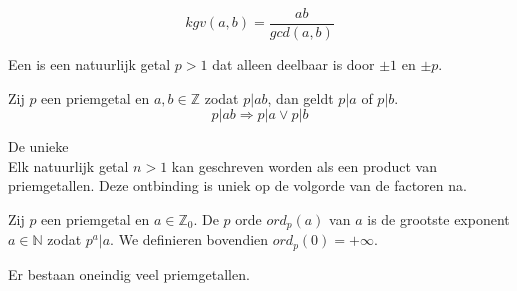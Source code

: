 \documentclass[main.tex]{subfiles}
\begin{document}
\begin{st}
  \[ kgv(a,b) = \frac{ab}{gcd(a,b)}\]

\end{st}

\begin{de}
  Een  is een natuurlijk getal $p > 1$ dat alleen deelbaar is door $\pm 1$ en $\pm p$.
\end{de}

\begin{st}
  Zij $p$ een priemgetal en $a,b \in \mathbb{Z}$ zodat $p|ab$, dan geldt $p|a$ of $p|b$.
  \[ p|ab \Rightarrow p|a \vee p|b \]

\end{st}

\begin{st}
  De unieke \\
  Elk natuurlijk getal $n > 1$ kan geschreven worden als een product van priemgetallen.
  Deze ontbinding is uniek op de volgorde van de factoren na.

\end{st}

\begin{de}
  Zij $p$ een priemgetal en $a \in \mathbb{Z}_{0}$. De $p$ orde $ord_{p}(a)$ van $a$ is de grootste exponent $a\in \mathbb{N}$ zodat $p^{a}|a$. We definieren bovendien $ord_{p}(0) = +\infty$.
\end{de}

\begin{st}
  Er bestaan oneindig veel priemgetallen.

\end{st}
\end{document}
